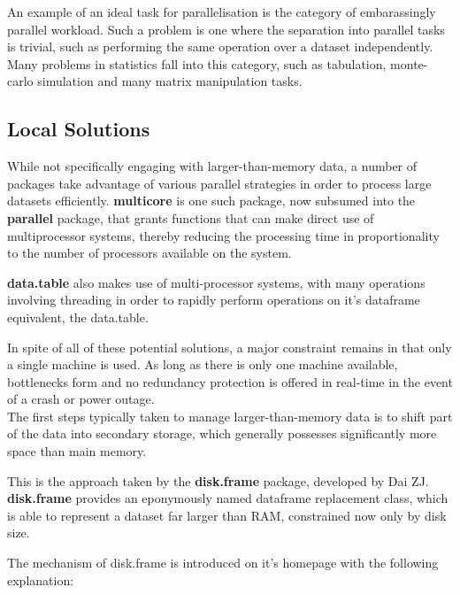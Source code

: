 An example of an ideal task for parallelisation is the category of embarassingly parallel workload.
Such a problem is one where the separation into parallel tasks is trivial, such as performing the same operation over a dataset independently\cite{foster1995parallel}.
Many problems in statistics fall into this category, such as tabulation, monte-carlo simulation and many matrix manipulation tasks.

\subsection{Local Solutions}
\label{local}

While not specifically engaging with larger-than-memory data, a number of packages take advantage of various parallel strategies in order to process large datasets efficiently.
\textbf{multicore} is one such package, now subsumed into the \textbf{parallel} package, that grants functions that can make direct use of multiprocessor systems, thereby reducing the processing time in proportionality to the number of processors available on the system.

\textbf{data.table} also makes use of multi-processor systems, with many operations involving threading in order to rapidly perform operations on it's dataframe equivalent, the data.table.

In spite of all of these potential solutions, a major constraint remains in that only a single machine is used.
As long as there is only one machine available, bottlenecks form and no redundancy protection is offered in real-time in the event of a crash or power outage.\\

The first steps typically taken to manage larger-than-memory data is to shift part of the data into secondary storage, which generally possesses significantly more space than main memory.

This is the approach taken by the \textbf{disk.frame} package, developed by Dai ZJ.
\textbf{disk.frame} provides an eponymously named dataframe replacement class, which is able to represent a dataset far larger than RAM, constrained now only by disk size\cite{zj20}.

The mechanism of disk.frame is introduced on it's homepage with the
following explanation:

